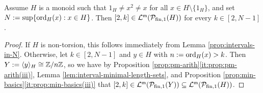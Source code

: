 \begin{thm}\label{th:interval-lengths}
Assume $H$ is a monoid such that $1_H \neq x^2 \neq x$ for all $x\in H\setminus\{1_H\}$, and set $N := \sup\{{\operatorname{ord}}_H(x) : x\in H \}$.
Then $[ 2, k ] \in \mathcal{L}^{\mathsf{m}}(\mathcal{P}_{\textrm{fin}, 1}(H))$ for every $k \in [ 2, N-1 ]$.
\end{thm}

\begin{proof}
If $H$ is non-torsion, this follows immediately from Lemma \ref{prop:intervals-in-N}.
Otherwise, let $k\in [ 2, N-1 ]$ and $y\in H$ with $n := {\operatorname{ord}}_H(x) > k$.
Then $Y :=\langle y \rangle_H \cong \mathbb{Z}/n\mathbb{Z}$, so we have by Proposition \ref{prop:pm-arith}\ref{it:prop:pm-arith(iii)}, Lemma \ref{lem:interval-minimal-length-sets}, and Proposition \ref{prop:min-basics}\ref{it:prop:min-basics(iii)} that
$[ 2, k ] \in \mathcal{L}^{\mathsf{m}}(\mathcal{P}_{\textrm{fin}, 1}(Y)) \subseteq \mathcal{L}^{\mathsf{m}}(\mathcal{P}_{\textrm{fin}, 1}(H))$.
\end{proof}
